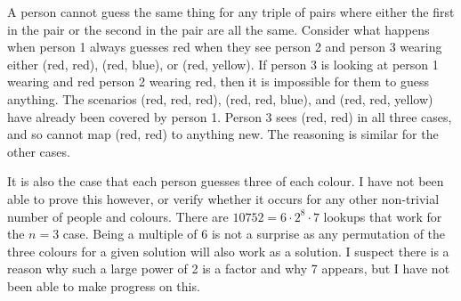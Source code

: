 A person cannot guess the same thing for any triple of pairs where either the first in the pair or the second in the pair are all the same. Consider what happens when person 1 always guesses red when they see person 2 and person 3 wearing either (red, red), (red, blue), or (red, yellow). If person 3 is looking at person 1 wearing and red person 2 wearing red, then it is impossible for them to guess anything. The scenarios (red, red, red), (red, red, blue), and (red, red, yellow) have already been covered by person 1. Person 3 sees (red, red) in all three cases, and so cannot map (red, red) to anything new. The reasoning is similar for the other cases.

It is also the case that each person guesses three of each colour. I have not been able to prove this however, or verify whether it occurs for any other non-trivial number of people and colours. There are $10752 = 6 \cdot 2^8 \cdot 7$ lookups that work for the $n = 3$ case. Being a multiple of 6 is not a surprise as any permutation of the three colours for a given solution will also work as a solution. I suspect there is a reason why such a large power of 2 is a factor and why 7 appears, but I have not been able to make progress on this.